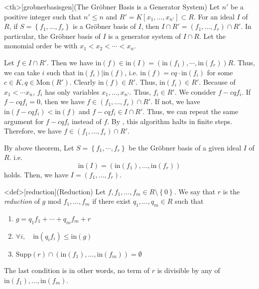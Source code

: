 \documentclass{article}
\begin{document}
\begin{statementsp}<th>[grobnerbasisgen](The Gr\"{o}bner Basis is a Generator System)
    Let $n'$ be a positive integer such that $n' \leq n$ and $R' = K[x_1, \ldots, x_{n'}] \subset R$. For an ideal $I$ of $R$, if $S = \left\{ f_1, \ldots, f_r \right\}$ is a Gr\"{o}bner basis of $I$, then $I \cap R' = (f_1, \ldots, f_r) \cap R'$. In particular, the Gr\"{o}bner basis of $I$ is a generator system of $I \cap R$.
    Let the monomial order be with $x_1 < x_2 < \cdots < x_n$.
\end{statementsp}
\begin{pfsp}
    Let $f \in I \cap R'$. Then we have $\mathrm{in}(f) \in \mathrm{in}(I) = \left( \mathrm{in}(f_1), \cdots, \mathrm{in}(f_r) \right) R$. Thus, we can take $i$ such that $\mathrm{in}(f_i) \vert \mathrm{in}(f)$, i.e. $\mathrm{in}(f) = cq \cdot \mathrm{in}(f_i)$ for some $c \in K, q \in \mathrm{Mon}(R')$. Clearly $\mathrm{in}(f) \in R'$. Thus, $\mathrm{in}(f_i) \in R'$. Because of $x_1 < \cdots  x_n$, $f_i$ has only variables $x_1, \ldots, x_{n'}$. Thus, $f_i \in R'$. We consider $f - cq f_i$. If $f - cq f_i = 0$, then we have $f \in (f_1, \ldots, f_r) \cap R'$. If not, we have $\mathrm{in}(f - cq f_i) < \mathrm{in}(f)$ and $f - cq f_i \in I \cap R'$. Thus, we can repeat the same argument for $f - cq f_i$ instead of $f$. By , this algorithm halts in finite steps. Therefore, we have $f \in (f_1, \ldots, f_r) \cap R'$.
\end{pfsp}

By above theorem, Let $S = \left\{ f_1, \cdots, f_r \right\}$ be the Gr\"{o}bner basis of a given ideal $I$ of $R$. i.e. $$\mathrm{in}(I) = \left( \mathrm{in}(f_1), \ldots, \mathrm{in}(f_r) \right)$$ holds. Then, we have $I = (f_1, \ldots, f_r)$. 

\begin{statementsp}<def>[reduction](Reduction)
    Let $f, f_1, \ldots, f_m \in R \setminus \left\{ 0 \right\}$. We say that $r$ is the \textit{reduction} of $g$ mod $f_1, \ldots, f_m$ if there exist $q_1, \ldots, q_m \in R$ such that
    \begin{enumerate}
        \item $g = q_1 f_1 + \cdots + q_m f_m + r$
        \item $\forall i, \quad \mathrm{in}(q_i f_i) \leq \mathrm{in}(g)$
        \item $\mathrm{Supp}(r) \cap (\mathrm{in}(f_1), \ldots, \mathrm{in}(f_m)) = \emptyset$
    \end{enumerate}
    The last condition is in other words, no term of $r$ is divisible by any of $\mathrm{in}(f_1), \ldots, \mathrm{in}(f_m)$.
\end{statementsp}
\end{document}
